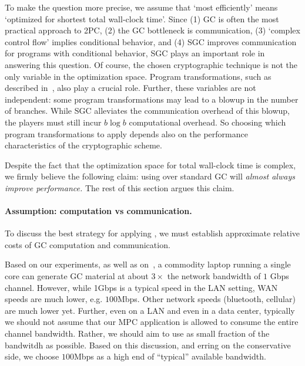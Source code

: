 To make the question more precise, we assume that `most efficiently' means
`optimized for shortest total wall-clock time'.
Since
(1) GC is often the most practical approach to 2PC,
(2) the GC bottleneck is communication,
(3) `complex control flow' implies conditional behavior, and
(4) SGC improves communication for programs with conditional behavior,
SGC plays an important role in answering this question.
%
Of course, the chosen cryptographic technique is not the only variable
in the optimization space.
Program transformations, such as described
in~, also play a crucial role.
%
Further, these variables are not independent:
some program transformations may lead to a blowup in the number of
branches.
While SGC alleviates the communication overhead of this blowup, the
players must still incur $b \log b$ computational overhead.
%
So choosing which program transformations to apply depends also on the
performance characteristics of the cryptographic scheme.

Despite the fact that the optimization space for total wall-clock time
is complex, we firmly believe the following claim:
using \ourschemelong over standard GC will \emph{almost always improve
  performance.}
The rest of this section argues this claim.

\paragraph{Assumption: computation vs communication.} 
To discuss the best strategy for applying \ourscheme, we must establish
approximate relative costs of GC computation and communication. 

 Based
on our experiments, as well as on~\cite{XiaoPersonalComm}, a commodity
laptop running a single core can generate GC material at about $3\times$ the
network bandwidth of $1$ Gbps channel.  
However, while 1Gbps is a typical speed in the LAN setting, WAN
speeds are much lower, e.g. $100$Mbps.  Other network speeds (bluetooth, cellular) are much lower yet.  Further, even on a LAN and even in a data center, typically we should not assume that our MPC application is allowed to consume the entire channel bandwidth. Rather, we should aim to use as small fraction of the bandwitdh as possible.  Based on this discussion, and erring on the conservative side,  we choose $100$Mbps as a high end of  ``typical'' available bandwidth.
%

